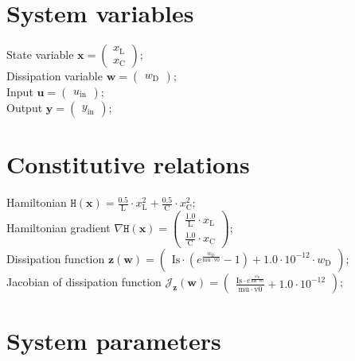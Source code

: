 \documentclass[11pt, oneside]{article}      %
\begin{document}
\section{System variables}
%
State variable $ \mathbf{x} = \left(\begin{array}{c}x_{\mathrm{L}}\\x_{\mathrm{C}}\end{array}\right) ; $ 
%
\\
%
Dissipation variable $ \mathbf{w} = \left(\begin{array}{c}w_{\mathrm{D}}\end{array}\right) ; $ 
%
\\
%
Input $ \mathbf{u} = \left(\begin{array}{c}u_{\mathrm{in}}\end{array}\right) ; $ 
%
\\
%
Output $ \mathbf{y} = \left(\begin{array}{c}y_{\mathrm{in}}\end{array}\right) ; $ 
%
\\
%
%
\section{Constitutive relations}
%
Hamiltonian $ \mathtt{H}(\mathbf{x}) = \frac{0.5}{\mathrm{L}} \cdot x_{\mathrm{L}}^{2} + \frac{0.5}{\mathrm{C}} \cdot x_{\mathrm{C}}^{2} ; $ 
%
\\
%
Hamiltonian gradient $ \nabla \mathtt{H}(\mathbf{x}) = \left(\begin{array}{c}\frac{1.0}{\mathrm{L}} \cdot x_{\mathrm{L}}\\\frac{1.0}{\mathrm{C}} \cdot x_{\mathrm{C}}\end{array}\right) ; $ 
%
\\
%
Dissipation function $ \mathbf{z}(\mathbf{w}) = \left(\begin{array}{c}\mathrm{Is} \cdot \left(e^{\frac{w_{\mathrm{D}}}{\mathrm{mu} \cdot \mathrm{v0}}} - 1\right) + 1.0 \cdot 10^{-12} \cdot w_{\mathrm{D}}\end{array}\right) ; $ 
%
\\
%
Jacobian of dissipation function $ \mathcal{J}_{\mathbf{z}}(\mathbf{w}) = \left(\begin{array}{c}\frac{\mathrm{Is} \cdot e^{\frac{w_{\mathrm{D}}}{\mathrm{mu} \cdot \mathrm{v0}}}}{\mathrm{mu} \cdot \mathrm{v0}} + 1.0 \cdot 10^{-12}\end{array}\right) ; $ 
%
\\
%
%
\section{System parameters}
%
%
\end{document}
